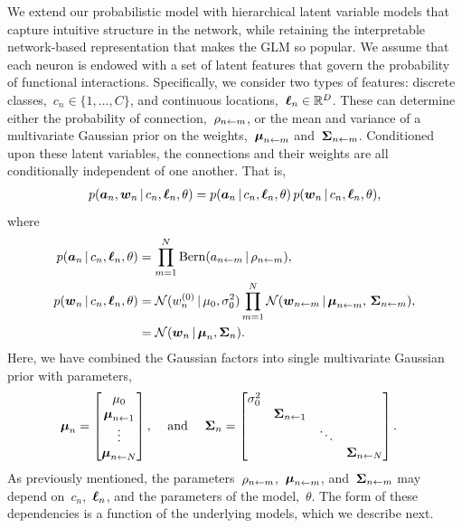 We extend our probabilistic model with hierarchical latent variable
models that capture intuitive structure in the network, while
retaining the interpretable network-based representation that makes
the GLM so popular. We assume that each neuron is endowed with a set
of latent features that govern the probability of functional
interactions. Specifically, we consider two types of features:
discrete classes,~$c_n \in \{1, \ldots, C\}$, and continuous
locations,~$\boldsymbol{\ell}_n \in \mathbb{R}^D$. These can determine either the
probability of connection,~$\rho_{n \leftarrow m}$, or the mean and
variance of a multivariate Gaussian prior on the
weights,~$\boldsymbol{\mu}_{n \leftarrow m}$ and~$\boldsymbol{\Sigma}_{n \leftarrow m}$.
Conditioned upon these latent variables, the connections and 
their weights are all conditionally independent of one another.
That is,
\begin{align}
  p(\boldsymbol{a}_n, \boldsymbol{w}_n \,|\, c_n, \boldsymbol{\ell}_n, \theta) = 
  p(\boldsymbol{a}_n \,|\, c_n, \boldsymbol{\ell}_n, \theta) \, p(\boldsymbol{w}_n \,|\, c_n, \boldsymbol{\ell}_n, \theta),
\end{align}
where
\begin{align}
  p(\boldsymbol{a}_n \,|\, c_n, \boldsymbol{\ell}_n, \theta) 
  &= \prod_{m=1}^N \mathrm{Bern}(a_{n \leftarrow m} \,|\, \rho_{n \leftarrow m}), \\
  p(\boldsymbol{w}_n \,|\, c_n, \boldsymbol{\ell}_n, \theta) 
  &= \mathcal{N}(w_n^{(0)} \,|\, \mu_0, \sigma^2_0 ) \prod_{m=1}^N 
     \mathcal{N}(\boldsymbol{w}_{n \leftarrow m} \,|\, \boldsymbol{\mu}_{n \leftarrow m}, \, \boldsymbol{\Sigma}_{n \leftarrow m}), \\
  &= \mathcal{N}(\boldsymbol{w}_n \,|\, \boldsymbol{\mu}_n, \boldsymbol{\Sigma}_n).
\end{align}
Here, we have combined the Gaussian factors into single multivariate Gaussian prior
with parameters,
\begin{align}
  \boldsymbol{\mu}_n 
    &= \begin{bmatrix}
      \mu_0 \\
      \boldsymbol{\mu}_{n \leftarrow 1} \\
      \vdots \\
      \boldsymbol{\mu}_{n \leftarrow N}
    \end{bmatrix}, & \text{ and } & &
  \boldsymbol{\Sigma}_n 
  &= \begin{bmatrix}
    \sigma_0^2 &                     &        & \\
               & \boldsymbol{\Sigma}_{n \leftarrow 1} &        & \\
               &                     & \ddots & \\
               &                     &        & \boldsymbol{\Sigma}_{n \leftarrow N} 
    \end{bmatrix}.
\end{align}
As previously mentioned, the parameters~$\rho_{n \leftarrow m}$,~$\boldsymbol{\mu}_{n \leftarrow m}$, and~$\boldsymbol{\Sigma}_{n \leftarrow m}$ 
may depend on~$c_n$,~$\boldsymbol{\ell}_n$, and the parameters of the model,~$\theta$.
The form of these dependencies is a function of the underlying models, 
which we describe next.


